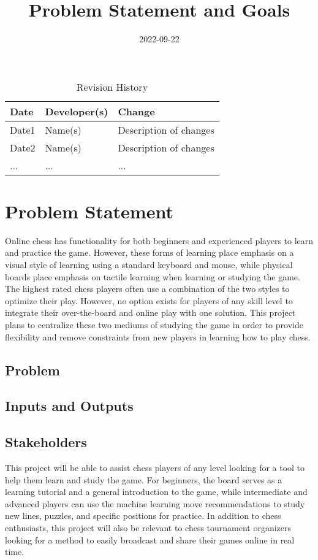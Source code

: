 \documentclass{article}
\title{Problem Statement and Goals\\\progname}
\author{\authname}
\date{2022-09-22}
\begin{document}
\maketitle

\begin{table}[hp]
\caption{Revision History} \label{TblRevisionHistory}
\begin{tabularx}{\textwidth}{llX}
\toprule
\textbf{Date} & \textbf{Developer(s)} & \textbf{Change}\\
\midrule
Date1 & Name(s) & Description of changes\\
Date2 & Name(s) & Description of changes\\
... & ... & ...\\
\bottomrule
\end{tabularx}
\end{table}

\section{Problem Statement}

{Online chess has functionality for both beginners and experienced players to learn and practice the game. However, these forms of learning place emphasis on a visual style of learning using a standard keyboard and mouse, while physical boards place emphasis on tactile learning when learning or studying the game. The highest rated chess players often use a combination of the two styles to optimize their play. However, no option exists for players of any skill level to integrate their over-the-board and online play with one solution. This project plans to centralize these two mediums of studying the game in order to provide flexibility and remove constraints from new players in learning how to play chess.}

\subsection{Problem}

\subsection{Inputs and Outputs}


\subsection{Stakeholders}
This project will be able to assist chess players of any level looking for a tool to help them learn and study the game. For beginners, the board serves as a learning tutorial and a general introduction to the game, while intermediate and advanced players can use the machine learning move recommendations to study new lines, puzzles, and specific positions for practice. In addition to chess enthusiasts, this project will also be relevant to chess tournament organizers looking for a method to easily broadcast and share their games online in real time. 
\end{document}
